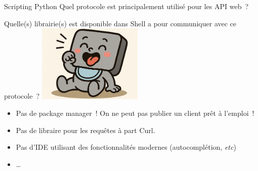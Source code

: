 \documentclass{beamer}
\begin{document}
    \begin{frame}{Scripting Python}
        Quel protocole est principalement utilisé pour les API web~?

        Quelle(s) librairie(s) est disponible dans Shell a pour communiquer avec ce protocole~?
        \bigbreak
        \centering
        \includegraphics[width=5cm]{image/baby-shell}
        \pause
        \begin{itemize}
            \item Pas de package manager~!
            On ne peut pas publier un client prêt à l'emploi~!
            \item Pas de libraire pour les requêtes à part Curl.
            \item Pas d'IDE utilisant des fonctionnalités modernes (autocomplétion, \textit{etc})
            \item \ldots
        \end{itemize}
    \end{frame}
\end{document}
